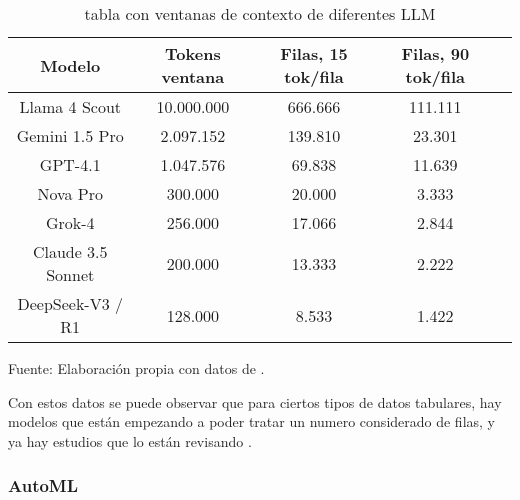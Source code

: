 \begin{table}[h]
	\renewcommand{\arraystretch}{1.3}
	\caption{tabla con ventanas de contexto de diferentes LLM}
	\begin{tabular}{|c|c|c|c|c|}
		\hline
		\textbf{Modelo} & \textbf{Tokens ventana} & \textbf{Filas, 15 tok/fila} & \textbf{Filas, 90 tok/fila} \\ \hline
		Llama 4 Scout & 10.000.000 & 666.666 & 111.111 \\ \hline
		Gemini 1.5 Pro & 2.097.152 & 139.810 & 23.301 \\ \hline
		GPT-4.1 & 1.047.576 & 69.838 & 11.639 \\ \hline
		Nova Pro & 300.000 & 20.000 & 3.333 \\ \hline
		Grok-4 & 256.000 & 17.066 & 2.844 \\ \hline
		Claude 3.5 Sonnet & 200.000 & 13.333 & 2.222 \\ \hline
		DeepSeek-V3 / R1 & 128.000 & 8.533 & 1.422 \\ \hline
	\end{tabular}
	\footnotesize Fuente: Elaboración propia con datos de \cite{LLMLeaderboardParameters}.
\end{table}

Con estos datos se puede observar que para ciertos tipos de datos tabulares, hay modelos que están empezando a poder tratar un numero considerado de filas, y ya hay estudios que lo están revisando \citep{fang2024llms}.

\subsubsection{AutoML}

